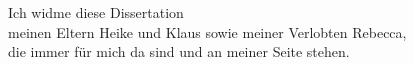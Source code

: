 \begin{titlepage}
\begin{center}
Ich widme diese Dissertation \\
meinen Eltern Heike und Klaus sowie meiner Verlobten Rebecca,\\
die immer für mich da sind und an meiner Seite stehen.


\end{center}


\cleardoublepage
\end{titlepage}
